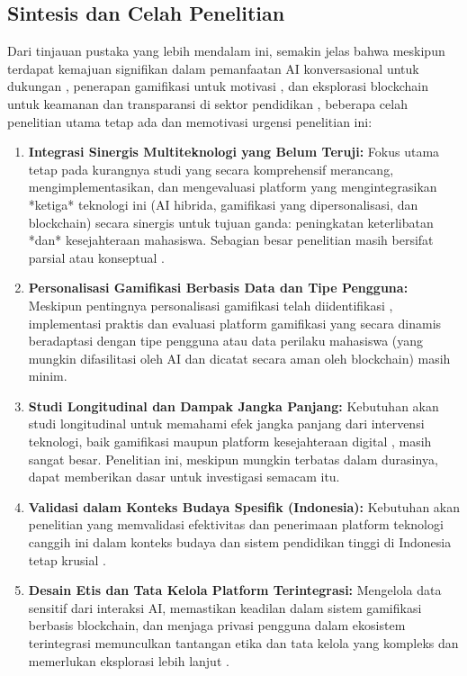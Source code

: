 \subsection{Sintesis dan Celah Penelitian}
\label{subsec:sintesis_celah_detail_revised}

Dari tinjauan pustaka yang lebih mendalam ini, semakin jelas bahwa meskipun terdapat kemajuan signifikan dalam pemanfaatan AI konversasional untuk dukungan \cite{empathetic_conversational_agents_mental_health_2024, rizvi_ai_tutoring_review_2023}, penerapan gamifikasi untuk motivasi \cite{gamification_higher_ed_review_2023, hanus_longitudinal_gamification_2015}, dan eksplorasi blockchain untuk keamanan dan transparansi di sektor pendidikan \cite{blockchain_education_transforming_2024, xi_blockchain_gamification_education_2020}, beberapa celah penelitian utama tetap ada dan memotivasi urgensi penelitian ini:
\begin{enumerate}
    \item \textbf{Integrasi Sinergis Multiteknologi yang Belum Teruji:} Fokus utama tetap pada kurangnya studi yang secara komprehensif merancang, mengimplementasikan, dan mengevaluasi platform yang mengintegrasikan *ketiga* teknologi ini (AI hibrida, gamifikasi yang dipersonalisasi, dan blockchain) secara sinergis untuk tujuan ganda: peningkatan keterlibatan *dan* kesejahteraan mahasiswa. Sebagian besar penelitian masih bersifat parsial atau konseptual \cite{integrated_metaverse_blockchain_ai_education_2025}.
    \item \textbf{Personalisasi Gamifikasi Berbasis Data dan Tipe Pengguna:} Meskipun pentingnya personalisasi gamifikasi telah diidentifikasi \cite{taskin_player_types_gamification_2022}, implementasi praktis dan evaluasi platform gamifikasi yang secara dinamis beradaptasi dengan tipe pengguna atau data perilaku mahasiswa (yang mungkin difasilitasi oleh AI dan dicatat secara aman oleh blockchain) masih minim.
    \item \textbf{Studi Longitudinal dan Dampak Jangka Panjang:} Kebutuhan akan studi longitudinal untuk memahami efek jangka panjang dari intervensi teknologi, baik gamifikasi \cite{hanus_longitudinal_gamification_2015} maupun platform kesejahteraan digital \cite{borges_digital_wellbeing_higher_ed_2021}, masih sangat besar. Penelitian ini, meskipun mungkin terbatas dalam durasinya, dapat memberikan dasar untuk investigasi semacam itu.
    \item \textbf{Validasi dalam Konteks Budaya Spesifik (Indonesia):} Kebutuhan akan penelitian yang memvalidasi efektivitas dan penerimaan platform teknologi canggih ini dalam konteks budaya dan sistem pendidikan tinggi di Indonesia tetap krusial \cite{chatbot_student_mental_health_unuja}.
    \item \textbf{Desain Etis dan Tata Kelola Platform Terintegrasi:} Mengelola data sensitif dari interaksi AI, memastikan keadilan dalam sistem gamifikasi berbasis blockchain, dan menjaga privasi pengguna dalam ekosistem terintegrasi memunculkan tantangan etika dan tata kelola yang kompleks dan memerlukan eksplorasi lebih lanjut \cite{challenges_gamification_higher_ed_2022, survey_blockchain_privacy_2024}.
\end{enumerate}

